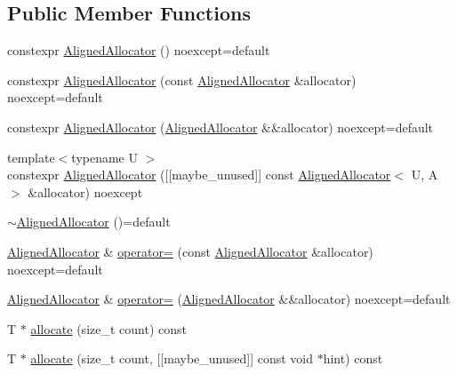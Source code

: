 \subsection*{Public Member Functions}
\begin{DoxyCompactItemize}
\item 
constexpr \mbox{\hyperlink{classmage_1_1_aligned_allocator_a87d49f18fe80cb61ff75cc6d9a8c4949}{Aligned\+Allocator}} () noexcept=default
\item 
constexpr \mbox{\hyperlink{classmage_1_1_aligned_allocator_a724b0692cf3c5e217c1281eaabd1ca4b}{Aligned\+Allocator}} (const \mbox{\hyperlink{classmage_1_1_aligned_allocator}{Aligned\+Allocator}} \&allocator) noexcept=default
\item 
constexpr \mbox{\hyperlink{classmage_1_1_aligned_allocator_ac2ef3124c1e18e07bb75006c28967c11}{Aligned\+Allocator}} (\mbox{\hyperlink{classmage_1_1_aligned_allocator}{Aligned\+Allocator}} \&\&allocator) noexcept=default
\item 
{\footnotesize template$<$typename U $>$ }\\constexpr \mbox{\hyperlink{classmage_1_1_aligned_allocator_a6f671f86583ecd883fa5c6ae22fd7fcb}{Aligned\+Allocator}} (\mbox{[}\mbox{[}maybe\+\_\+unused\mbox{]}\mbox{]} const \mbox{\hyperlink{classmage_1_1_aligned_allocator}{Aligned\+Allocator}}$<$ U, A $>$ \&allocator) noexcept
\item 
\mbox{\hyperlink{classmage_1_1_aligned_allocator_aafac29097c8439629bc814d1f5bd0d24}{$\sim$\+Aligned\+Allocator}} ()=default
\item 
\mbox{\hyperlink{classmage_1_1_aligned_allocator}{Aligned\+Allocator}} \& \mbox{\hyperlink{classmage_1_1_aligned_allocator_afb59c244009982c6f61e4fd7479f40fd}{operator=}} (const \mbox{\hyperlink{classmage_1_1_aligned_allocator}{Aligned\+Allocator}} \&allocator) noexcept=default
\item 
\mbox{\hyperlink{classmage_1_1_aligned_allocator}{Aligned\+Allocator}} \& \mbox{\hyperlink{classmage_1_1_aligned_allocator_a349db9153bdafabebac1e85836637f2f}{operator=}} (\mbox{\hyperlink{classmage_1_1_aligned_allocator}{Aligned\+Allocator}} \&\&allocator) noexcept=default
\item 
T $\ast$ \mbox{\hyperlink{classmage_1_1_aligned_allocator_a62d718a737dd6f436d086b626f9ab519}{allocate}} (size\+\_\+t count) const
\item 
T $\ast$ \mbox{\hyperlink{classmage_1_1_aligned_allocator_a12f2a6829d8d88dceeffea4363c95088}{allocate}} (size\+\_\+t count, \mbox{[}\mbox{[}maybe\+\_\+unused\mbox{]}\mbox{]} const void $\ast$hint) const

\end{DoxyCompactItemize}
